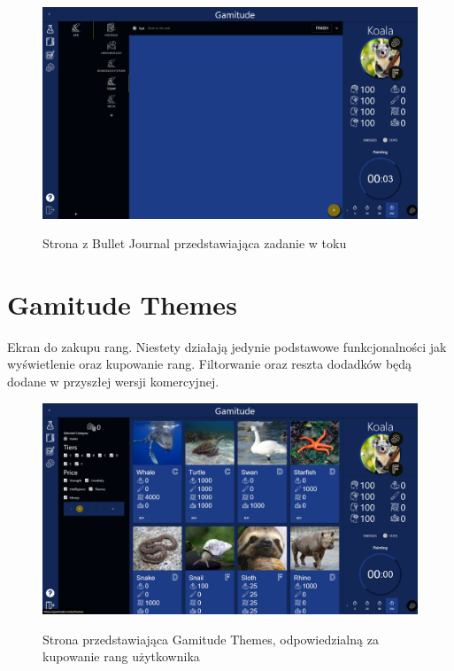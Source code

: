 \documentclass[a4paper,11pt]{report}
\begin{document}
\begin{figure}[H]
	\centering
	\includegraphics[scale=0.3]{prezentacja/Bullet_Session}\\
	\caption{Strona z Bullet Journal przedstawiająca zadanie w toku}
	\label{fig:Bullet_Session}
\end{figure}
\section{Gamitude Themes}
Ekran do zakupu rang. Niestety działają jedynie podstawowe funkcjonalności jak wyświetlenie oraz kupowanie rang.
Filtorwanie oraz reszta dodadków będą dodane w przyszłej wersji komercyjnej.
\begin{figure}[H]
	\centering
	\includegraphics[scale=0.3]{prezentacja/Gamitude_Themes}\\
	\caption{Strona przedstawiająca Gamitude Themes, odpowiedzialną za kupowanie rang użytkownika}
	\label{fig:Gamitude_Themes}
\end{figure}
\end{document}
